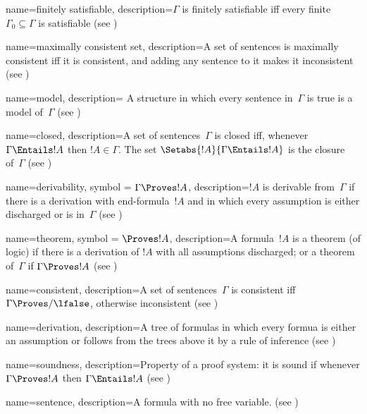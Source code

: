  {
  name={finitely satisfiable},  
  description={$\Gamma$ is finitely satisfiable iff every finite
    $\Gamma_0 \subseteq \Gamma$ is satisfiable (see
    )} }

 {
  name=maximally consistent set,  
  description={A set of {sentence}s is maximally consistent iff it
    is consistent, and adding any {sentence} to it makes it
    inconsistent (see )} }

 {
  name=model,  
  description={ A {structure} in which every {sentence}
    in~$\Gamma$ is true is a model of~$\Gamma$ (see
    )} }

 {
  name=closed, 
  description={A set of {sentence}s~$\Gamma$ is closed iff, whenever
    $\Gamma \Entails !A$ then $!A \in \Gamma$. The set
    $\Setabs{!A}{\Gamma \Entails !A}$ is the closure of~$\Gamma$ (see
    )} }

 {
  name=derivability,
  symbol = {\ensuremath{\Gamma \Proves !A}},  
  description={$!A$ is {derivable} from~$\Gamma$ if there is a
    {derivation} with end-{formula}~$!A$ and in which every
    assumption is either {discharged} or is in~$\Gamma$ (see
    )} }

 {
  name={theorem},
  symbol = {\ensuremath{\Proves !A}},
  description={A {formula}~$!A$ is a theorem (of logic) if there is
    a {derivation} of $!A$ with all assumptions \gls{discharged}; or a
    theorem of~$\Gamma$ if $\Gamma \Proves !A$ (see
    )} }

 {
  name=consistent,
  description={A set of sentences~$\Gamma$ is consistent iff $\Gamma
    \Proves/ \lfalse$, otherwise inconsistent (see
    )} }

 {
  name=derivation,  
  description={A tree of formulas in which every formua is either an
    assumption or follows from the trees above it by a rule of
    inference (see )} }

 {
  name=soundness, 
  description={Property of a proof system: it is sound if whenever
    $\Gamma \Proves !A$ then $\Gamma \Entails !A$ (see
    )} }

 {
  name=sentence,  
  description={A {formula} with no \gls{free} variable. (see
    )} }

